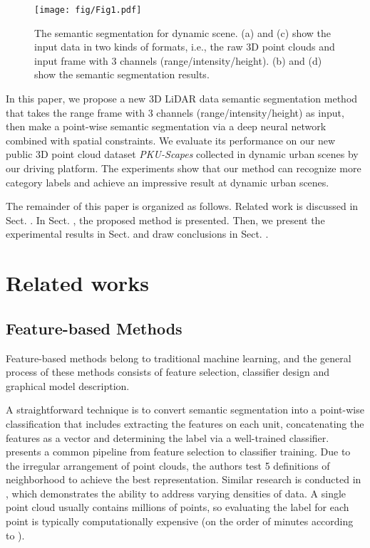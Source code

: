 \begin{figure}
	\centering
	\texttt{[image: fig/Fig1.pdf]}
	\caption{The semantic segmentation for dynamic scene. (a) and (c) show the input data in two kinds of formats, i.e., the raw 3D point clouds and input frame with 3 channels (range/intensity/height). (b) and (d) show the semantic segmentation results.}
	\label{fig:dynamiccampus}
\end{figure}	

In this paper, we propose a new 3D LiDAR data semantic segmentation method that takes the range frame with 3 channels (range/intensity/height) as input, then make a point-wise semantic segmentation via a deep neural network combined with spatial constraints. 
We evaluate its performance on our new public 3D point cloud dataset \textit{PKU-Scapes} collected in dynamic urban scenes by our driving platform. The experiments show that our method can recognize more category labels and achieve an impressive result at dynamic urban scenes.

The remainder of this paper is organized as follows. Related work is discussed in Sect. \uppercase\expandafter{}. In Sect. \uppercase\expandafter{}, the proposed method is presented. Then, we present the experimental results in Sect. \uppercase\expandafter{} and draw conclusions in Sect. \uppercase\expandafter{}.


\section{Related works}
\subsection{Feature-based Methods}
Feature-based methods belong to traditional machine learning, and the general process of these methods consists of feature selection, classifier design and graphical model description.

A straightforward technique is to convert semantic segmentation into a point-wise classification that includes extracting the features on each unit, concatenating the features as a vector and determining the label via a well-trained classifier. \cite{weinmann2014semantic} presents a common pipeline from feature selection to classifier training. Due to the irregular arrangement of point clouds, the authors test 5 definitions of neighborhood to achieve the best representation. Similar research is conducted in \cite{hackel2016fast}, which demonstrates the ability to address varying densities of data. A single point cloud usually contains millions of points, so evaluating the label for each point is typically computationally expensive (on the order of minutes according to \cite{hackel2016fast}). 

